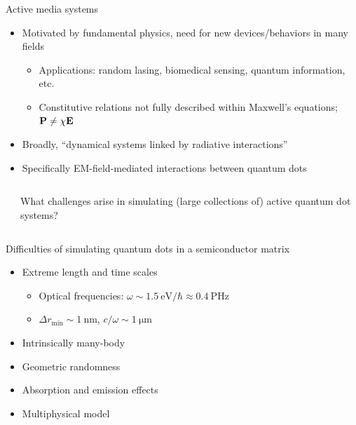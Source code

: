 \documentclass[aspectratio=169, usenames, dvipsnames]{beamer}
\begin{document}
\begin{frame}{Active media systems}
  \begin{itemize}
    \item Motivated by fundamental physics, need for new devices/behaviors in many fields
      \begin{itemize}
        \item[] Applications: random lasing, biomedical sensing, quantum information, etc.
        \item[] Constitutive relations not fully described within Maxwell's equations; $\vb{P} \not = \chi \vb{E}$
      \end{itemize}
    \item Broadly, ``dynamical systems linked by radiative interactions''
    \item Specifically EM-field-mediated interactions between quantum dots
  \end{itemize}
  \begin{columns}
    \begin{column}{0.5\textwidth}
      \begin{center}
        
      \end{center}
    \end{column}
    \begin{column}{0.5\textwidth}
      \begin{block}{}
        What challenges arise in simulating (large collections of) active quantum dot systems?
      \end{block}
    \end{column}
  \end{columns}
\end{frame}

\begin{frame}{Difficulties of simulating quantum dots in a semiconductor matrix}
  \begin{itemize}
    \item[] Extreme length and time scales
      \begin{itemize}
        \item Optical frequencies: $\omega \sim \SI{1.5}{\eV \per \hbar} \approx \SI{0.4}{\peta\hertz}$
        \item $\Delta r_\text{min} \sim \SI{1}{\nano\meter}$, $c/\omega \sim \SI{1}{\micro\meter}$
      \end{itemize}
    \item[] Intrinsically many-body
    \item[] Geometric randomness
    \item[] Absorption and emission effects
    \item[] Multiphysical model
  \end{itemize}
\end{frame}
\end{document}
